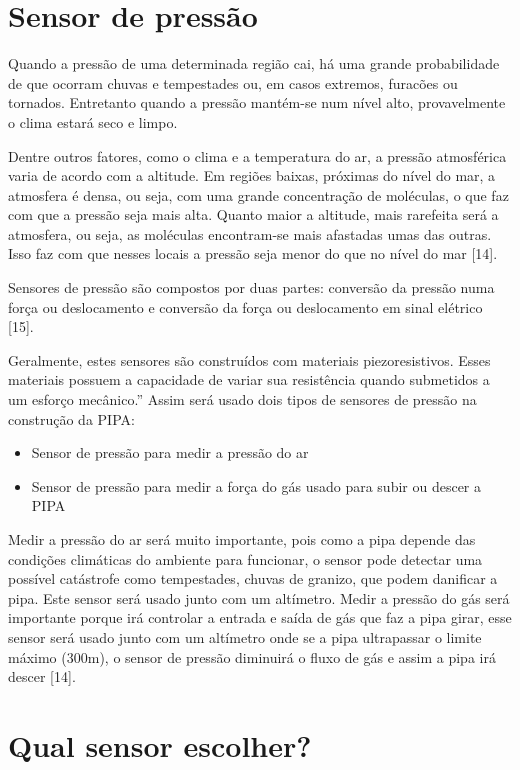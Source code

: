 \section{Sensor de pressão}

Quando a pressão de uma determinada região cai, há uma grande probabilidade de que ocorram chuvas e tempestades ou, em casos extremos, furacões ou tornados. Entretanto quando a pressão mantém-se num nível alto, provavelmente o clima estará seco e limpo.

Dentre outros fatores, como o clima e a temperatura do ar, a pressão atmosférica varia de acordo com a altitude. Em regiões baixas, próximas do nível do mar, a atmosfera é densa, ou seja, com uma grande concentração de moléculas, o que faz com que a pressão seja mais alta. Quanto maior a altitude, mais rarefeita será a atmosfera, ou seja, as moléculas encontram-se mais afastadas umas das outras. Isso faz com que nesses locais a pressão seja menor do que no nível do mar [14].

Sensores de pressão são compostos por duas partes: conversão da pressão numa força ou deslocamento e conversão da força ou deslocamento em sinal elétrico [15].

Geralmente, estes sensores são construídos com materiais piezoresistivos. Esses materiais possuem a capacidade de variar sua resistência quando submetidos a um esforço mecânico.” Assim será usado dois tipos de sensores de pressão na construção da PIPA:

\begin{itemize}
\item Sensor de pressão para medir a pressão do ar
\item Sensor de pressão para medir a força do gás usado para subir ou descer a PIPA
\end{itemize}

Medir a pressão do ar será muito importante, pois como a pipa depende das condições climáticas do ambiente para funcionar, o sensor pode detectar uma possível catástrofe como tempestades, chuvas de granizo, que podem danificar a pipa. Este sensor será usado junto com um altímetro.
Medir a pressão do gás será importante porque irá controlar a entrada e saída de gás que faz a pipa girar, esse sensor será usado junto com um altímetro onde se a pipa ultrapassar o limite máximo (300m), o sensor de pressão diminuirá o fluxo de gás e assim a pipa irá descer [14].

\section{Qual sensor escolher?}
	
